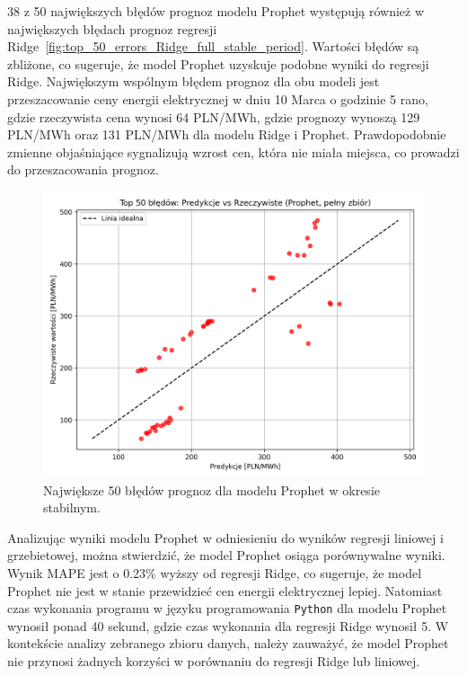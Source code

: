 38 z 50 największych błędów prognoz modelu Prophet występują również w największych błędach prognoz regresji Ridge~\ref{fig:top_50_errors_Ridge_full_stable_period}. Wartości błędów są zbliżone, co sugeruje, że model Prophet uzyskuje podobne wyniki do regresji Ridge. Największym wspólnym błędem prognoz dla obu modeli jest przeszacowanie ceny energii elektrycznej w dniu 10 Marca o godzinie 5 rano, gdzie rzeczywista cena wynosi 64 PLN/MWh, gdzie prognozy wynoszą 129 PLN/MWh oraz 131 PLN/MWh dla modelu Ridge i Prophet. Prawdopodobnie zmienne objaśniające sygnalizują wzrost cen, która nie miała miejsca, co prowadzi do przeszacowania prognoz.

\begin{figure}[H]
    \centering
    \includegraphics[width=1.0\textwidth]{../../plots/predicts/top_50_errors_Prophet_full_stable_period_comb_1.png}
    \caption{Największe 50 błędów prognoz dla modelu Prophet w okresie stabilnym.}
    \label{fig:top_50_errors_Prophet_stable}
\end{figure}

Analizując wyniki modelu Prophet w odniesieniu do wyników regresji liniowej i grzebietowej, można stwierdzić, że model Prophet osiąga porównywalne wyniki. Wynik MAPE jest o 0.23\% wyższy od regresji Ridge, co sugeruje, że model Prophet nie jest w stanie przewidzieć cen energii elektrycznej lepiej. Natomiast czas wykonania programu w języku programowania \texttt{Python} dla modelu Prophet wynosił ponad 40 sekund, gdzie czas wykonania dla regresji Ridge wynosił 5. W kontekście analizy zebranego zbioru danych, należy zauważyć, że model Prophet nie przynosi żadnych korzyści w porównaniu do regresji Ridge lub liniowej.

